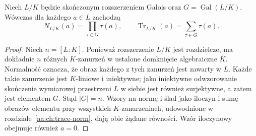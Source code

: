 \begin{lemat}\label{aa:lem:galois-norm-product}
Niech $L/K$ będzie skończonym rozszerzeniem Galois oraz
$G=\operatorname{Gal}(L/K)$. Wówczas dla każdego $a\in L$ zachodzą
\[
N_{L/K}(a)=\prod_{\tau\in G}\tau(a),\qquad
\operatorname{Tr}_{L/K}(a)=\sum_{\tau\in G}\tau(a).
\]
\end{lemat}
\begin{proof}
Niech $n=[L:K]$. Ponieważ rozszerzenie $L/K$ jest rozdzielcze,
ma dokładnie $n$ różnych $K$-zanurzeń w ustalone domknięcie
algebraiczne $\overline K$. Normalność oznacza, że obraz każdego
z tych zanurzeń jest zawarty w $L$. Każde takie zanurzenie jest
$K$-liniowe i iniektywne; jako iniektywne odwzorowanie skończenie
wymiarowej przestrzeni $L$ w siebie jest również surjektywne,
a zatem jest elementem $G$.
Stąd $|G|=n$. Wzory na normę i ślad jako iloczyn i sumę
obrazów elementu przy wszystkich $K$-zanurzeniach,
udowodnione w rozdziale~\ref{aa:ch:trace-norm},
dają obie żądane równości. Wzór iloczynowy obejmuje również $a=0$.
\end{proof}

